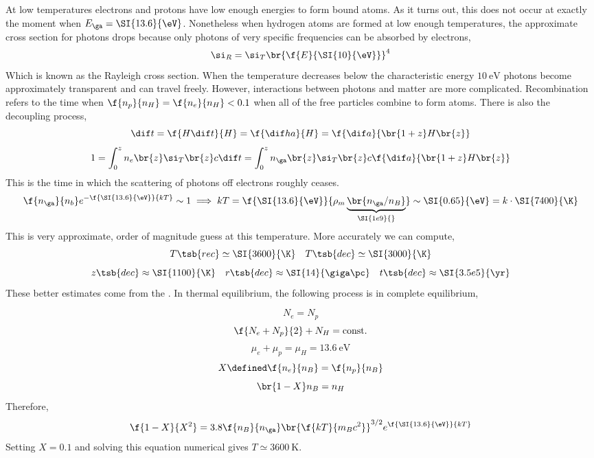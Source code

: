 \documentclass{article}
\begin{document}
At low temperatures electrons and protons have low enough energies to form bound atoms. As it turns out, this does not occur at exactly the moment when $E_\ga = \SI{13.6}{\eV}$. Nonetheless when hydrogen atoms are formed at low enough temperatures, the approximate cross section for photons drops because only photons of very specific frequencies can be absorbed by electrons,
\[ \si_R = \si_T \br{\f{E}{\SI{10}{\eV}}}^{4} \]
Which is known as the Rayleigh cross section. When the temperature decreases below the characteristic energy $\SI{10}{\eV}$ photons become approximately transparent and can travel freely. However, interactions between photons and matter are more complicated. Recombination refers to the time when $\f{n_p}{n_H} = \f{n_e}{n_H} < 0.1$ when all of the free particles combine to form atoms. There is also the decoupling process,
\[ \dif t = \f{H \dif t}{H} = \f{\dif h a}{H} = \f{\dif a}{\br{1 + z} H\br{z}} \]
\[ 1 = \int_0^z n_e\br{z} \si_T \br{z} c \dif t = \int_0^z n_\ga\br{z} \si_T \br{z} c \f{\dif a}{\br{1 + z} H\br{z}} \]
This is the time in which the scattering of photons off electrons roughly ceases.
\[ \f{n_\ga}{n_b}e^{-\f{\SI{13.6}{\eV}}{kT}} \sim 1 \implies kT = \f{\SI{13.6}{\eV}}{\rho_m \underbrace{\br{n_\ga / n_B}}_{\SI{1e9}{}}} \sim \SI{0.65}{\eV} = k \cdot \SI{7400}{\K} \]
This is very approximate, order of magnitude guess at this temperature. More accurately we can compute,
\[ T\tsb{rec} \simeq \SI{3600}{\K} \quad T\tsb{dec} \simeq \SI{3000}{\K} \]
\[ z\tsb{dec} \approx \SI{1100}{\K} \quad r\tsb{dec} \approx \SI{14}{\giga\pc} \quad t\tsb{dec} \approx \SI{3.5e5}{\yr} \]
These better estimates come from the . In thermal equilibrium, the following process is in complete equilibrium,
\begin{center}
\end{center}

\[ N_e = N_p \]
\[ \f{N_e + N_p}{2} + N_H = \text{const.}  \]
\[ \mu_e + \mu_p = \mu_H = \SI{13.6}{\eV} \]
\[ X \defined \f{n_e}{n_B} = \f{n_p}{n_B} \]
\[ \br{1 - X}n_B = n_H \]
Therefore,
\[ \f{1 - X}{X^2} = 3.8 \f{n_B}{n_\ga}\br{\f{kT}{m_B c^2}}^{3/2}  e^{\f{\SI{13.6}{\eV}}{kT}} \]
Setting $X = 0.1$ and solving this equation numerical gives $T \simeq \SI{3600}{\K}$.
\end{document}
